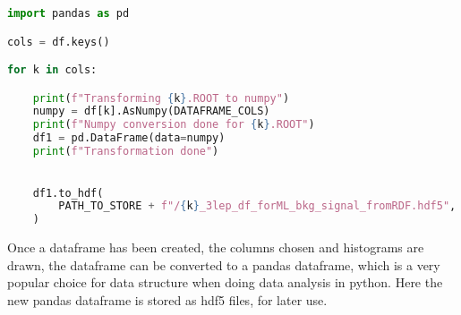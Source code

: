 \begin{lstlisting}[language=Python, style=pythonstyle, label={code:python_func_example}]
import pandas as pd 

cols = df.keys()

for k in cols:

    print(f"Transforming {k}.ROOT to numpy")
    numpy = df[k].AsNumpy(DATAFRAME_COLS)
    print(f"Numpy conversion done for {k}.ROOT")
    df1 = pd.DataFrame(data=numpy)
    print(f"Transformation done")
    

    df1.to_hdf(
        PATH_TO_STORE + f"/{k}_3lep_df_forML_bkg_signal_fromRDF.hdf5", "mini"
    )

\end{lstlisting}


Once a dataframe has been created, the columns chosen and histograms are drawn, the dataframe can be converted to a pandas dataframe, which is a very popular choice
for data structure when doing data analysis in python. Here the new pandas dataframe is stored as hdf5\cite{hdf5} files, for later use. 